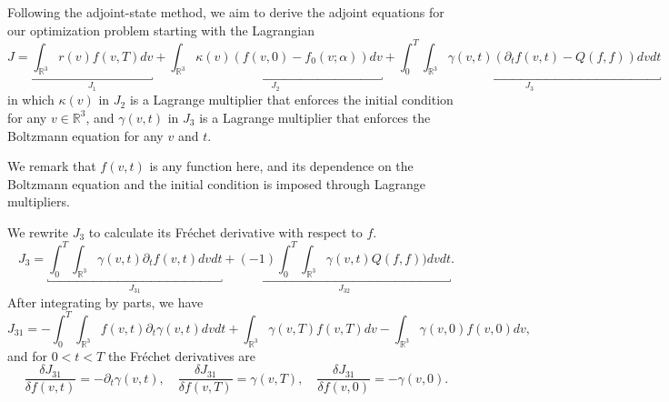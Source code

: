 \documentclass[times,final,nopreprintline]{elsarticle}
\newcommand{\bbR}{\mathbb R} \newcommand{\bbS}{\mathbb S}
\newcommand{\Rthree}{{\bbR^3}}
\begin{document}
Following the adjoint-state method, we aim to derive the adjoint equations for our optimization problem starting with the Lagrangian
\begin{equation*}%
J=\underbracket{\int_\Rthree r(v) f(v,T) dv}_{J_1} +\underbracket{\int_\Rthree \kappa(v) (f(v,0)-f_0(v;\alpha)) dv}_{J_2} +\underbracket{\int_0^T\int_\Rthree \gamma(v,t) ( \partial_t  f(v,t) - Q(f,f) ) dv dt}_{J_3}
\end{equation*}
in which $\kappa(v)$ in $J_2$ is a Lagrange multiplier that enforces the initial condition for any $v\in \bbR^3$, and $\gamma(v,t)$  in $J_3$ is a Lagrange multiplier that enforces the Boltzmann equation for any  $v$ and $t$. 

We remark that $f(v,t)$ is any function here, and its dependence on the Boltzmann equation and the initial condition is imposed through Lagrange multipliers.

We rewrite $J_3$ to calculate its Fr\'echet derivative with respect to $f$.
\begin{equation*}
J_3 = \underbracket{\int_0^T \int_{\bbR^3} \gamma(v,t) \partial_t  f(v,t)  dv dt}_{J_{31}} + \underbracket{(-1) \int_0^T \int_{\bbR^3} \gamma(v,t)  Q(f,f) ) dv dt}_{J_{32}}.
\end{equation*}
After integrating by parts, we have
\begin{equation*}
J_{31}= - \int_0^T \int_{\bbR^3}  f(v,t)  \partial_t  \gamma(v,t)  dv dt + \int_{\bbR^3} \gamma(v,T)   f(v,T) dv - \int_{\bbR^3} \gamma(v,0 )  f(v,0) dv,
\end{equation*}
and for $0<t<T$ the Fr\'echet derivatives are 
\begin{equation*}
\frac{\delta J_{31} }{ \delta {f(v,t)}} = - \partial_t  \gamma(v,t),\quad \frac{\delta J_{31} }{\delta {f(v,T)} } = \gamma(v,T),\quad 
 \frac{\delta J_{31} }{ \delta {f(v,0)} } = -\gamma(v,0 ).
\end{equation*}
\end{document}
